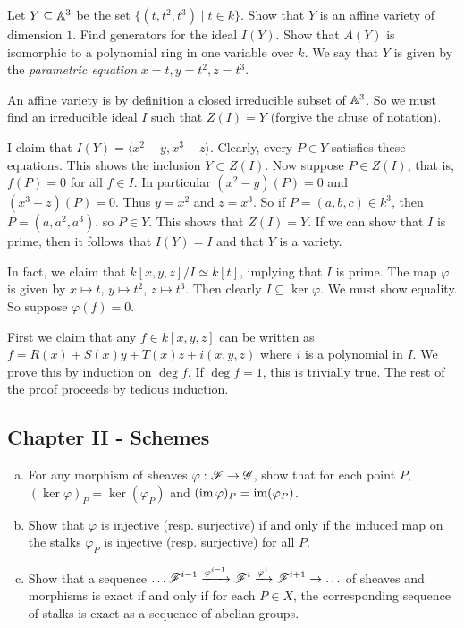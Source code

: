 \documentclass[11pt, english]{article}
\begin{document}
\begin{exc}

Let $Y \subseteq \mathbb{A}^3$ be the set $\{ (t,t^2,t^3) \mid t \in k\}$. Show that $Y$ is an affine variety of dimension $1$. Find generators for the ideal $I(Y)$. Show that $A(Y)$ is isomorphic to a polynomial ring in one variable over $k$. We say that $Y$ is given by the \emph{parametric equation} $x=t,y=t^2,z=t^3$.  
\end{exc}
\begin{sol}
An affine variety is by definition a closed irreducible subset of $\mathbb{A}^3$. So we must find an irreducible ideal $I$ such that $Z(I)=Y$ (forgive the abuse of notation).

I claim that $I(Y)=\langle x^2-y,x^3-z \rangle$. Clearly, every $P \in Y$ satisfies these equations. This shows the inclusion $Y \subset Z(I)$. Now suppose $P \in Z(I)$, that is, $f(P)=0$ for all $f \in I$. In particular $(x^2-y)(P)=0$ and $(x^3-z)(P)=0$. Thus $y=x^2$ and $z=x^3$. So if $P=(a,b,c) \in k^3$, then $P=(a,a^2,a^3)$, so $P \in Y$. This shows that $Z(I)=Y$. If we can show that $I$ is prime, then it follows that $I(Y)=I$ and that $Y$ is a variety.

In fact, we claim that $k[x,y,z]/I \simeq k[t]$, implying that $I$ is prime. The map $\varphi$ is given by $x \mapsto t$, $y \mapsto t^2$, $z \mapsto t^3$. Then clearly $I \subseteq \ker \varphi$. We must show equality. So suppose $\varphi(f)=0$. 

First we claim that any $f \in k[x,y,z]$ can be written as $f=R(x)+S(x)y+T(x)z+i(x,y,z)$ where $i$ is a polynomial in $I$. We prove this by induction on $\deg f$. If $\deg f = 1$, this is trivially true.  The rest of the proof proceeds by tedious induction.
\end{sol}

\subsection{Chapter II - Schemes}

\begin{exc}[Exercise 1.2]
  \begin{enumerate}[a)]
  \item For any morphism of sheaves $\varphi:\operatorname{\mathscr{F}} \to \mathscr G$, show that for each point $P$, $(\ker \varphi)_P = \ker (\varphi_P)$ and $(\operatorname{im} \varphi)_P =  \operatorname{im}(\varphi_P)$. 
\item Show that $\varphi$ is injective (resp. surjective) if and only if the induced map on the stalks $\varphi_P$ is injective (resp. surjective) for all $P$.
\item Show that a sequence $\ldots \operatorname{\mathscr{F}}^{i-1} \xrightarrow{\varphi^{i-1}} \operatorname{\mathscr{F}}^i \xrightarrow{\varphi^{i}}  \operatorname{\mathscr{F}}^{i+1} \to \ldots$ of sheaves and morphisms is exact if and only if for each $P \in X$, the corresponding sequence of stalks is exact as a sequence of abelian groups.
\end{enumerate}
\end{exc}
\end{document}
